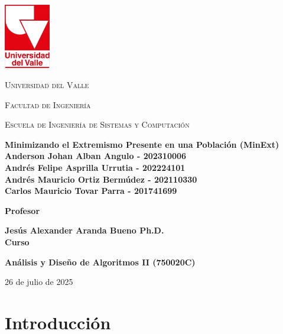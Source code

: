 \documentclass[11pt,letter]{article}
\begin{document}
\onehalfspacing

\begin{titlepage}
\centering
\includegraphics[width=0.15\textwidth]{resources/universidad-del-valle.png}\par\vspace{1cm}
{\scshape\LARGE Universidad del Valle \par}
{\scshape\Large Facultad de Ingeniería \par}
{\scshape\Large Escuela de Ingeniería de Sistemas y Computación \par}
\vspace{2cm}

{\Large \textbf{Minimizando el Extremismo Presente en
 una Población (MinExt)}}\\

\vspace{2cm}
    {\large \textbf{Anderson Johan Alban Angulo - 202310006}}\\
    {\large \textbf{Andrés Felipe Asprilla Urrutia - 202224101 }}\\
    {\large \textbf{Andrés Mauricio Ortiz Bermúdez - 202110330}}\\
    {\large \textbf{Carlos Mauricio Tovar Parra - 201741699}}\\
\vspace{2cm}

    \Large\textbf{Profesor}\par
    {\large \textbf{Jesús Alexander Aranda Bueno Ph.D.}}\\
\vspace{1.4cm}
    \Large\textbf{Curso}\par
    {\large \textbf{Análisis y Diseño de Algoritmos II (750020C)}}\\
\vspace{1cm}
{\large {26 de julio de 2025}\par}
\end{titlepage}

\tableofcontents
\newpage

\section{Introducción}
\end{document}
